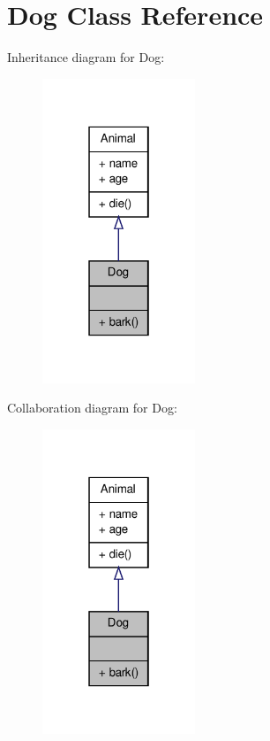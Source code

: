 \hypertarget{class_dog}{\section{Dog Class Reference}
\label{class_dog}
}


Inheritance diagram for Dog\-:
\nopagebreak
\begin{figure}[H]
\begin{center}
\leavevmode
\includegraphics[width=130pt]{class_dog__inherit__graph}
\end{center}
\end{figure}


Collaboration diagram for Dog\-:
\nopagebreak
\begin{figure}[H]
\begin{center}
\leavevmode
\includegraphics[width=130pt]{class_dog__coll__graph}
\end{center}
\end{figure}
